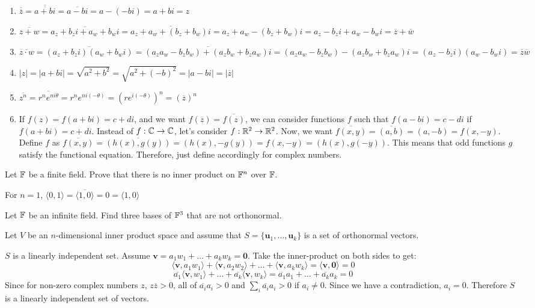 \documentclass{scrartcl}
\newcommand{\bv}{\mathbf{v}}
\newcommand{\bu}{\mathbf{u}}
\newcommand{\angb}[1]{\langle #1 \rangle}
\begin{document}
\begin{enumerate}
    \item $\overline{\overline{z}}=\overline{\overline{a+bi}} = \overline{a-bi} =
              a-(-bi) = a+bi = z$
    \item $\overline{z+w} = \overline{a_z+b_zi+a_w+b_wi} = \overline{a_z+a_w+(b_
                  z+b_w)i} = a_z + a_w - (b_z + b_w)i = a_z - b_zi + a_w -b_wi = \overline{z}+
              \overline{w}$
    \item $\overline{z \cdot w} = \overline{(a_z+b_zi)(a_w+b_wi)} = \overline{
                  (a_za_w-b_zb_w) + (a_zb_w+b_za_w)i} = (a_za_w-b_zb_w) - (a_zb_w+b_za_w)i =
              (a_z-b_zi)(a_w-b_wi) = \overline{z}\overline{w}$
    \item $|z| = |a+bi| = \sqrt{a^2+b^2} = \sqrt{a^2+(-b)^2} = |a-bi| =
              |\overline{z}|$
    \item $\overline{z^n} = \overline{r^ne^{ni\theta}} = r^ne^{ni(-\theta)} = (re
                  ^{i(-\theta)})^n = (\overline{z})^n$
    \item If $f(z) = f(a+bi) = c+di$, and we want $f(\overline{z}) = \overline{f
                  (z)}$, we can consider functions $f$ such that $f(a-bi) = c-di$ if $f(a+bi) =
              c+di$. Instead of $f: \mathbb C \to \mathbb C$, let's consider $f: \mathbb R^2 \to \mathbb R^2$.
          Now, we want $\overline{f(x, y)} = \overline{(a, b)} = (a, -b) = f(x, -y)$.
          Define $f$ as $\overline{f(x, y)} = \overline{(h(x), g(y))} = (h(x), -g(y))=
              f(x, -y) = (h(x), g(-y))$. This means that odd functions $g$ satisfy the
          functional equation. Therefore, just define accordingly for complex numbers.
\end{enumerate}

\begin{problem}
Let $\mathbb F$ be a finite field. Prove that there is no inner product on $\mathbb F^n$ over
$\mathbb F$.
\end{problem}
For $n = 1$, $\angb{0,1} = \overline{\angb{1, 0}} = 0 = \angb{1, 0}$

\begin{problem}
Let $\mathbb F$ be an infinite field. Find three bases of $\mathbb F^3$ that are not
orthonormal.
\end{problem}

\begin{problem}
Let $V$ be an $n$-dimensional inner product space and assume that $S=\{
    \bu_1, \dots, \bu_k\}$ is a set of orthonormal vectors.
\end{problem}
$S$ is a linearly independent set. Assume $\bv = a_1w_1 + \dots + a_kw_k = \mathbf{0}$.
Take the inner-product on both sides to get:
\[\angb{\bv, a_1w_1} + \angb{\bv, a_2w_2} + \dots + \angb{\bv, a_kw_k} = \angb{\bv, \mathbf{0}} = 0\]
\[\overline{a_1}\angb{\bv, w_1} + \dots + \overline{a_k}\angb{\bv, w_k} =
    \overline{a_1}a_1 + \dots + \overline{a_k}a_k = 0\]
Since for non-zero complex numbers $z$, $z\overline{z} > 0$, all of $\overline{a_i}a_i > 0$
and $\sum_i{\overline{a_i}a_i} > 0$ if $a_i \neq 0$. Since we have a contradiction,
$a_i = 0$. Therefore $S$ is a linearly independent set of vectors.
\end{document}
